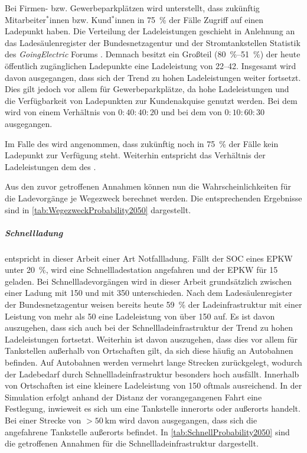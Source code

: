 Bei Firmen- bzw. Gewerbeparkplätzen wird unterstellt, dass zukünftig Mitarbeiter$^*$innen bzw. Kund$^*$innen in \SI{75}{\percent} der Fälle Zugriff auf einen Ladepunkt haben.
Die Verteilung der Ladeleistungen geschieht in Anlehnung an das Ladesäulenregister der Bundesnetzagentur \cite[][Stand: ]{BundesnetzagenturElektrizitaet2020} und der Stromtankstellen Statistik des \textit{GoingElectric} Forums \cite[][Stand: ]{Weemaes2020}.
Demnach besitzt ein Großteil (\SIrange[range-phrase=~bzw.~]{80}{51}{\percent}) der heute öffentlich zugänglichen Ladepunkte eine Ladeleistung von \SIrange{22}{42}{\kw}.
Insgesamt wird davon ausgegangen, dass sich der Trend zu hohen Ladeleistungen weiter fortsetzt.
Dies gilt jedoch vor allem für Gewerbeparkplätze, da hohe Ladeleistungen und die Verfügbarkeit von Ladepunkten zur Kundenakquise genutzt werden.
Bei dem \UC \Firmeparkplatz wird von einem Verhältnis von \(0:40:40:20\) und bei dem \UC \Gewerbeparkplatz von \(0:10:60:30\) ausgegangen.\medskip

Im Falle des \UC \Straszenrand wird angenommen, dass zukünftig noch in \SI{75}{\percent} der Fälle kein Ladepunkt zur Verfügung steht.
Weiterhin entspricht das Verhältnis der Ladeleistungen dem des \UC \Firmeparkplatzdot.\medskip

Aus den zuvor getroffenen Annahmen können nun die Wahrscheinlichkeiten für die Ladevorgänge je Wegezweck berechnet werden.
Die entsprechenden Ergebnisse sind in \autoref{tab:WegezweckProbability2050} dargestellt.




\subparagraph{Schnellladung} entspricht in dieser Arbeit einer Art Notfallladung.
Fällt der \gls{SOC} eines \gls{EPKW} unter \SI{20}{\percent}, wird eine Schnellladestation angefahren und der \gls{EPKW} für \SI{15}{\Minuten} geladen.
Bei Schnellladevorgängen wird in dieser Arbeit grundsätzlich zwischen einer Ladung mit \SI{150}{\kw} und mit \SI{350}{\kw} unterschieden.
Nach dem Ladesäulenregister der Bundesnetzagentur \cite[][Stand: ]{BundesnetzagenturElektrizitaet2020} weisen bereits heute \SI{59}{\percent} der Ladeinfrastruktur mit einer Leistung von mehr als \SI{50}{\kw} eine Ladeleistung von über \SI{150}{\kw} auf.
Es ist davon auszugehen, dass sich auch bei der Schnellladeinfrastruktur der Trend zu hohen Ladeleistungen fortsetzt.
Weiterhin ist davon auszugehen, dass dies vor allem für Tankstellen außerhalb von Ortschaften gilt, da sich diese häufig an Autobahnen befinden.
Auf Autobahnen werden vermehrt lange Strecken zurückgelegt, wodurch der Ladebedarf durch Schnellladeinfrastruktur besonders hoch ausfällt.
Innerhalb von Ortschaften ist eine kleinere Ladeleistung von \SI{150}{\kw} oftmals ausreichend.
In der Simulation erfolgt anhand der Distanz der vorangegangenen Fahrt eine Festlegung, inwieweit es sich um eine Tankstelle innerorts oder außerorts handelt.
Bei einer Strecke von \(>\!\SI{50}{\km}\) wird davon ausgegangen, dass sich die angefahrene Tankstelle außerorts befindet.
In \autoref{tab:SchnellProbability2050} sind die getroffenen Annahmen für die Schnellladeinfrastruktur dargestellt.

